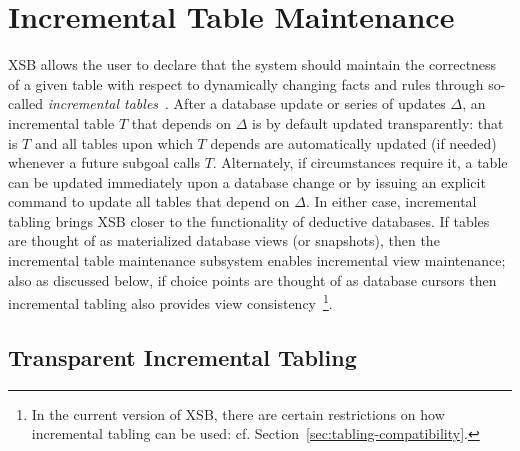 \section{Incremental Table Maintenance} \label{sec:incremental_tabling}


XSB allows the user to declare that the system should maintain the
correctness of a given table with respect to dynamically changing
facts and rules through so-called {\em incremental
  tables}~\cite{SaRa05,Saha06,Swif14}.
After a database update or series of updates $\Delta$, an incremental
table $T$ that depends on $\Delta$ is by default updated
transparently: that is $T$ and all tables upon which $T$ depends are
automatically updated (if needed) whenever a future subgoal calls $T$.
Alternately, if circumstances require it, a table can be updated
immediately upon a database change or by issuing an explicit command
to update all tables that depend on $\Delta$.
%
In either case, incremental tabling brings XSB closer to the
functionality of deductive databases.  If tables are thought of as
materialized database views (or snapshots), then the incremental table
maintenance subsystem enables incremental view maintenance; also as
discussed below, if choice points are thought of as database cursors
then incremental tabling also provides view consistency~\footnote{In
  the current version of XSB, there are certain restrictions on how
  incremental tabling can be used:
  cf. Section~\ref{sec:tabling-compatibility}.}.

\subsection{Transparent Incremental Tabling} \label{sec:incr_examples}

